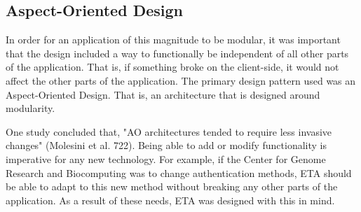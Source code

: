 \documentclass[a4paper,12pt]{texMemo}
\begin{document}
\subsection{Aspect-Oriented Design}
In order for an application of this magnitude to be modular, it was important that the design included a way to functionally be independent of all other parts of the application. That is, if something broke on the client-side, it would not affect the other parts of the application. The primary design pattern used was an Aspect-Oriented Design. That is, an architecture that is designed around modularity. 

One study concluded that, "AO architectures tended to require less invasive changes" (Molesini et al. 722). Being able to add or modify functionality is imperative for any new technology. For example, if the Center for Genome Research and Biocomputing was to change authentication methods, ETA should be able to adapt to this new method without breaking any other parts of the application. As a result of these needs, ETA was designed with this in mind.
\end{document}

